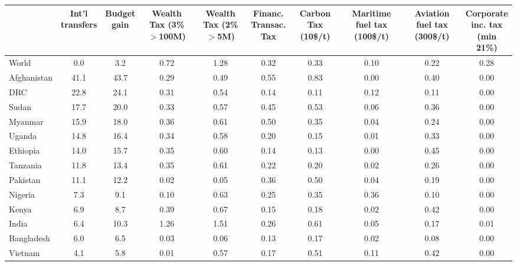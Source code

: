 
\begin{tabular}[t]{lccccccccc}
\toprule
  & \makecell{Int'l\\transfers} & \makecell{Budget\\gain} & \makecell{Wealth\\Tax (3\%\\$>$100M)} & \makecell{Wealth\\Tax (2\%\\$>$5M)} & \makecell{Financ.\\Transac.\\Tax} & \makecell{Carbon\\Tax\\(10\$/t)} & \makecell{Maritime\\fuel tax\\(100\$/t)} & \makecell{Aviation\\fuel tax\\(300\$/t)} & \makecell{Corporate\\inc. tax\\(min 21\%)}\\
\midrule
World & 0.0 & 3.2 & 0.72 & 1.28 & 0.32 & 0.33 & 0.10 & 0.22 & 0.28\\
Afghanistan & 41.1 & 43.7 & 0.29 & 0.49 & 0.55 & 0.83 & 0.00 & 0.40 & 0.00\\
DRC & 22.8 & 24.1 & 0.31 & 0.54 & 0.14 & 0.11 & 0.12 & 0.11 & 0.00\\
Sudan & 17.7 & 20.0 & 0.33 & 0.57 & 0.45 & 0.53 & 0.06 & 0.36 & 0.00\\
Myanmar & 15.9 & 18.0 & 0.36 & 0.61 & 0.50 & 0.35 & 0.04 & 0.24 & 0.00\\
Uganda & 14.8 & 16.4 & 0.34 & 0.58 & 0.20 & 0.15 & 0.01 & 0.33 & 0.00\\
Ethiopia & 14.0 & 15.7 & 0.35 & 0.60 & 0.14 & 0.13 & 0.00 & 0.45 & 0.00\\
Tanzania & 11.8 & 13.4 & 0.35 & 0.61 & 0.22 & 0.20 & 0.02 & 0.26 & 0.00\\
Pakistan & 11.1 & 12.2 & 0.02 & 0.05 & 0.36 & 0.50 & 0.04 & 0.19 & 0.00\\
Nigeria & 7.3 & 9.1 & 0.10 & 0.63 & 0.25 & 0.35 & 0.36 & 0.10 & 0.00\\
Kenya & 6.9 & 8.7 & 0.39 & 0.67 & 0.15 & 0.18 & 0.02 & 0.42 & 0.00\\
India & 6.4 & 10.3 & 1.26 & 1.51 & 0.26 & 0.61 & 0.05 & 0.17 & 0.01\\
Bangladesh & 6.0 & 6.5 & 0.03 & 0.06 & 0.13 & 0.17 & 0.02 & 0.08 & 0.00\\
Vietnam & 4.1 & 5.8 & 0.01 & 0.57 & 0.17 & 0.51 & 0.11 & 0.42 & 0.00\\

\end{tabular}
